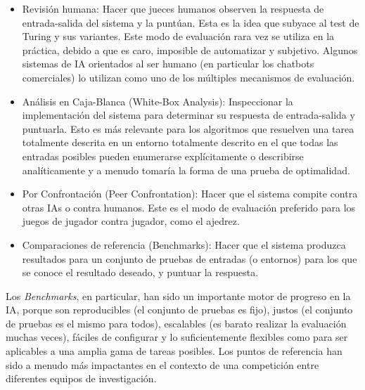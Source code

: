 \begin{itemize}
\item Revisión humana: Hacer que jueces humanos observen la respuesta de entrada-salida del sistema y la puntúan. Esta es la idea que subyace al test de Turing y sus variantes. Este modo de evaluación rara vez se utiliza en la práctica, debido a que es caro, imposible de automatizar y subjetivo. Algunos sistemas de IA orientados al ser humano (en particular los chatbots comerciales) lo utilizan como uno de los múltiples mecanismos de evaluación.

\item Análisis en Caja-Blanca (White-Box Analysis): Inspeccionar la implementación del sistema para determinar su respuesta de entrada-salida y puntuarla. Esto es más relevante para los algoritmos que resuelven una tarea totalmente descrita en un entorno totalmente descrito en el que todas las entradas posibles pueden enumerarse explícitamente o describirse analíticamente y a menudo tomaría la forma de una prueba de optimalidad.

\item Por Confrontación (Peer Confrontation): Hacer que el sistema compite contra otras IAs o contra humanos. Este es el modo de evaluación preferido para los juegos de jugador contra jugador, como el ajedrez.

\item Comparaciones de referencia (Benchmarks): Hacer que el sistema produzca resultados para un conjunto de pruebas de entradas (o entornos) para los que se conoce el resultado deseado, y puntuar la respuesta.
\end{itemize}

Los \textit{Benchmarks}, en particular, han sido un importante motor de progreso en la IA, porque son reproducibles (el conjunto de pruebas es fijo), justos (el conjunto de pruebas es el mismo para todos), escalables (es barato realizar la evaluación muchas veces), fáciles de configurar y lo suficientemente flexibles como para ser aplicables a una amplia gama de tareas posibles. Los puntos de referencia han sido a menudo más impactantes en el contexto de una competición entre diferentes equipos de investigación.

